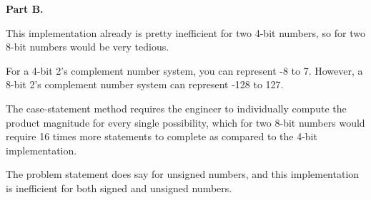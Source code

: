 \documentclass{article}
\begin{document}
\textbf{Part B.}

This implementation already is pretty inefficient for two 4-bit numbers, so for two 8-bit numbers would be very tedious.

\smallskip

For a 4-bit 2's complement number system, you can represent -8 to 7. However, a 8-bit 2's complement number system can represent -128 to 127.

\smallskip

The case-statement method requires the engineer to individually compute the product magnitude for every single possibility, which for two 8-bit numbers would require 16 times more statements to complete as compared to the 4-bit implementation.

\smallskip

The problem statement does say for unsigned numbers, and this implementation is inefficient for both signed and unsigned numbers.
\end{document}
